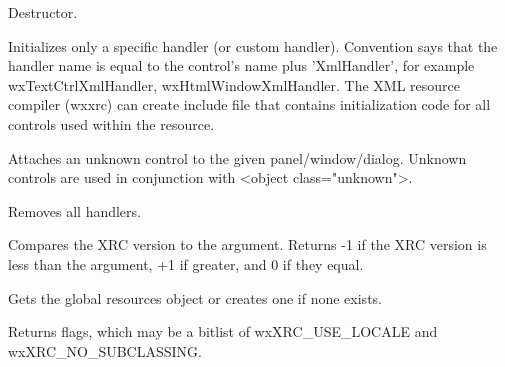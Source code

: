\label{wxxmlresourcedtor}


Destructor.


\label{wxxmlresourceaddhandler}


Initializes only a specific handler (or custom handler). Convention says
that the handler name is equal to the control's name plus 'XmlHandler', for example
wxTextCtrlXmlHandler, wxHtmlWindowXmlHandler. The XML resource compiler
(wxxrc) can create include file that contains initialization code for
all controls used within the resource.


\label{wxxmlresourceattachunknowncontrol}


Attaches an unknown control to the given panel/window/dialog.
Unknown controls are used in conjunction with <object class="unknown">.


\label{wxxmlresourceclearhandlers}


Removes all handlers.


\label{wxxmlresourcecompareversion}


Compares the XRC version to the argument. Returns -1 if the XRC version
is less than the argument, +1 if greater, and 0 if they equal.


\label{wxxmlresourceget}


Gets the global resources object or creates one if none exists.


\label{wxxmlresourcegetflags}


Returns flags, which may be a bitlist of wxXRC\_USE\_LOCALE and wxXRC\_NO\_SUBCLASSING.


